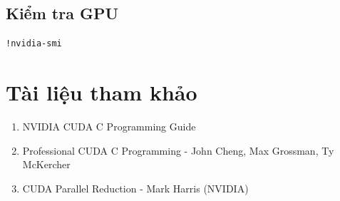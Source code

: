 \documentclass[12pt,a4paper]{article}
\begin{document}
\subsection{Kiểm tra GPU}

\begin{lstlisting}[language=bash, caption=Kiểm tra thông tin GPU]
!nvidia-smi
\end{lstlisting}

\section{Tài liệu tham khảo}

\begin{enumerate}
    \item NVIDIA CUDA C Programming Guide
    \item Professional CUDA C Programming - John Cheng, Max Grossman, Ty McKercher
    \item CUDA Parallel Reduction - Mark Harris (NVIDIA)
\end{enumerate}
\end{document}
